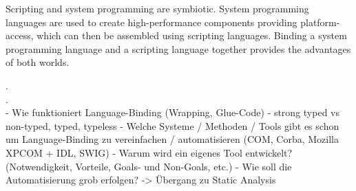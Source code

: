 Scripting and system programming are symbiotic. System programming languages are used to create high-performance components providing platform-access, which can then be assembled using scripting languages. Binding a system programming language and a scripting language together provides the advantages of both worlds.

.\\
.\\
  - Wie funktioniert Language-Binding (Wrapping, Glue-Code)
  - strong typed vs non-typed, typed, typeless
  - Welche Systeme / Methoden / Tools gibt es schon um Language-Binding zu vereinfachen / automatisieren (COM, Corba, Mozilla XPCOM + IDL, SWIG)
  - Warum wird ein eigenes Tool entwickelt? (Notwendigkeit, Vorteile, Goals- und Non-Goals, etc.)
  - Wie soll die Automatisierung grob erfolgen? -> Übergang zu Static Analysis